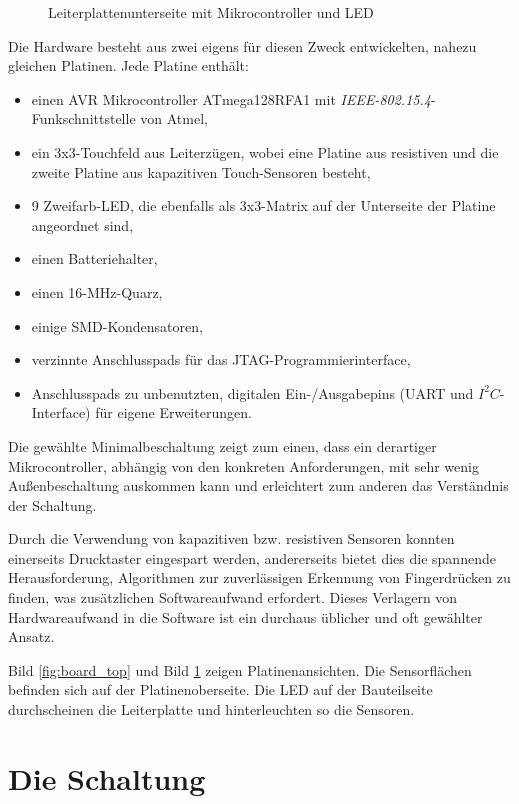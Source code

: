 \documentclass{clt2012}
\renewcommand{\figurename}{Bild}
\begin{document}
\begin{figure}
\begin{minipage}[hbt]{0.45\linewidth}
	\caption{Leiterplattenunterseite mit Mikrocontroller und LED}
	\label{fig:board_solder}
\end{minipage}
\end{figure}


Die Hardware besteht aus zwei eigens für diesen Zweck entwickelten, nahezu gleichen Platinen.
Jede Platine enthält:

\begin{itemize}
\setlength{\itemsep}{0pt}
\item einen AVR Mikrocontroller \mbox{ATmega128RFA1} mit \emph{IEEE-802.15.4}-Funk\-schnitt\-stel\-le von Atmel,
\item ein 3x3-Touchfeld aus Leiterzügen, wobei eine Platine aus resistiven und die zweite
      Platine aus kapazitiven Touch-Sensoren besteht,
\item 9 Zweifarb-LED, die ebenfalls als 3x3-Matrix auf der Unterseite
  der Platine angeordnet sind,
\item einen Batteriehalter,
\item einen 16-MHz-Quarz,
\item einige SMD-Kondensatoren,
\item verzinnte Anschlusspads für das JTAG-Programmierinterface,
\item Anschluss\-pads zu unbenutzten,
      digitalen Ein-/Ausgabepins (UART und $I^2C$-Interface) für eigene Erweiterungen.
\end{itemize}

Die gewählte Minimalbeschaltung zeigt zum einen, dass ein derartiger Mikrocontroller, abhängig
von den konkreten Anforderungen, mit sehr wenig Außenbeschaltung auskommen kann und erleichtert zum
anderen das Verständnis der Schaltung.

Durch die Verwendung von kapazitiven bzw. resistiven Sensoren konnten einerseits Drucktaster
eingespart werden, andererseits bietet dies die spannende Herausforderung, Algorithmen zur
zuverlässigen Erkennung von Fingerdrücken zu finden, was zusätzlichen
Softwareaufwand erfordert. Dieses Verlagern von Hardwareaufwand in die Software ist ein
durchaus üblicher und oft gewählter Ansatz.

\figurename{} \ref{fig:board_top} und \figurename{} \ref{fig:board_solder} zeigen
Platinenansichten. Die Sensorflächen befinden sich auf der Platinenoberseite.
Die LED auf der Bauteilseite durchscheinen die Leiterplatte und hinterleuchten so die Sensoren.

\section{Die Schaltung}
\end{document}

